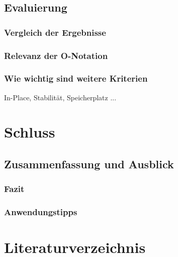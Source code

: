 \documentclass{article}
\begin{document}


\subsection{Evaluierung}
\subsubsection{Vergleich der Ergebnisse}
\subsubsection{Relevanz der O-Notation}
\subsubsection{Wie wichtig sind weitere Kriterien}
In-Place, Stabilität, Speicherplatz ...

\section{Schluss}
\subsection{Zusammenfassung und Ausblick}
\subsubsection{Fazit}
\subsubsection{Anwendungstipps}

\section{Literaturverzeichnis}

%



\end{document}
